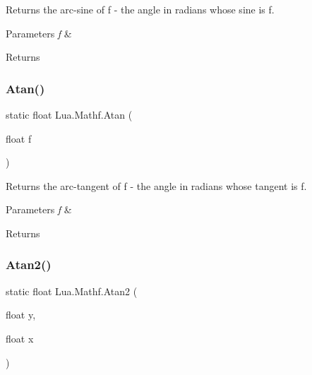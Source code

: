 Returns the arc-\/sine of f -\/ the angle in radians whose sine is f. 


\begin{DoxyParams}{Parameters}
{\em f} & \\
\hline
\end{DoxyParams}
\begin{DoxyReturn}{Returns}

\end{DoxyReturn}
\mbox{\label{class_lua_1_1_mathf_a03740fc6f71760901fbe5f8a6295edeb}} 
\subsubsection{\texorpdfstring{Atan()}{Atan()}}
{\footnotesize\ttfamily static float Lua.\+Mathf.\+Atan (\begin{DoxyParamCaption}\item[{float}]{f }\end{DoxyParamCaption})\hspace{0.3cm}{\ttfamily [static]}}



Returns the arc-\/tangent of f -\/ the angle in radians whose tangent is f. 


\begin{DoxyParams}{Parameters}
{\em f} & \\
\hline
\end{DoxyParams}
\begin{DoxyReturn}{Returns}

\end{DoxyReturn}
\mbox{\label{class_lua_1_1_mathf_ab7f3034dcb7244d1cfb06ae17f014278}} 
\subsubsection{\texorpdfstring{Atan2()}{Atan2()}}
{\footnotesize\ttfamily static float Lua.\+Mathf.\+Atan2 (\begin{DoxyParamCaption}\item[{float}]{y,  }\item[{float}]{x }\end{DoxyParamCaption})\hspace{0.3cm}{\ttfamily [static]}}



